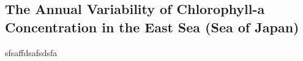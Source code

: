 \subsection{The Annual Variability of Chlorophyll-a Concentration in the East Sea (Sea of Japan)}
 
sfsaffdsafsdsfa



